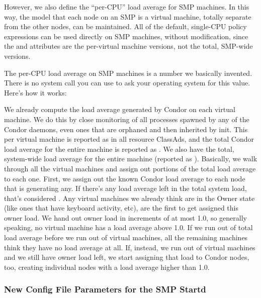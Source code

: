 However, we also define the ``per-CPU'' load average for SMP machines.
In this way, the model that each node on an SMP is a virtual machine,
totally separate from the other nodes, can be maintained.
All of the default, single-CPU policy expressions can be used directly
on SMP machines, without modification, since the  and
 attributes are the per-virtual machine versions,
not the total, SMP-wide versions.

The per-CPU load average on SMP machines is a number we basically
invented. 
There is no system call you can use to ask your operating system for
this value.
Here's how it works:

We already compute the load average generated by Condor on each
virtual machine.
We do this by close monitoring of all processes spawned by any of the
Condor daemons, even ones that are orphaned and then inherited by
init. 
This  per virtual machine is reported as
 in all resource ClassAds, and the total Condor
load average for the entire machine is reported as
. 
We also have the total, system-wide load average for the entire
machine (reported as ).
Basically, we walk through all the virtual machines and assign out
portions of the total load average to each one. 
First, we assign out the known Condor load average to each node that
is generating any.  
If there's any load average left in the total system load, that's
considered .
Any virtual machines we already think are in the Owner state (like
ones that have keyboard activity, etc), are the first to get assigned
this owner load.
We hand out owner load in increments of at most 1.0, so generally
speaking, no virtual machine has a load average above 1.0.
If we run out of total load average before we run out of virtual
machines, all the remaining machines think they have no load average
at all.
If, instead, we run out of virtual machines and we still have owner
load left, we start assigning that load to Condor nodes, too, creating
individual nodes with a load average higher than 1.0.

\subsubsection{\label{sec:New-SMP-Parameters}
New Config File Parameters for the SMP Startd}

